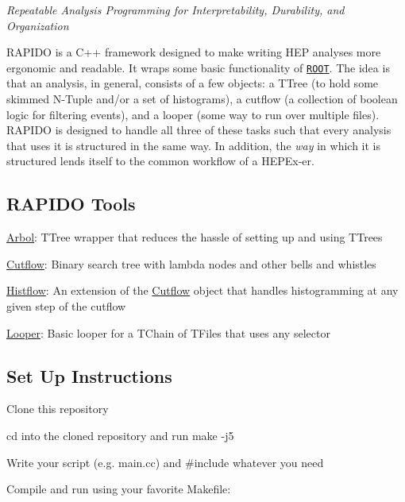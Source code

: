 {\itshape Repeatable Analysis Programming for Interpretability, Durability, and Organization}

\href{https://opensource.org/licenses/MIT}{\tt } \href{https://jkguiang.github.io/rapido/html/index.html}{\tt } \href{https://www.codefactor.io/repository/github/jkguiang/rapido/overview/master}{\tt }

R\+A\+P\+I\+DO is a C++ framework designed to make writing H\+EP analyses more ergonomic and readable. It wraps some basic functionality of \href{https://root.cern/}{\tt R\+O\+OT}. The idea is that an analysis, in general, consists of a few objects\+: a T\+Tree (to hold some skimmed N-\/\+Tuple and/or a set of histograms), a cutflow (a collection of boolean logic for filtering events), and a looper (some way to run over multiple files). R\+A\+P\+I\+DO is designed to handle all three of these tasks such that every analysis that uses it is structured in the same way. In addition, the {\itshape way} in which it is structured lends itself to the common workflow of a H\+E\+P\+Ex-\/er.

\subsection*{R\+A\+P\+I\+DO Tools}


\begin{DoxyEnumerate}
\item \hyperlink{classArbol}{Arbol}\+: T\+Tree wrapper that reduces the hassle of setting up and using T\+Trees
\item \hyperlink{classCutflow}{Cutflow}\+: Binary search tree with lambda nodes and other bells and whistles
\begin{DoxyItemize}
\item \hyperlink{classHistflow}{Histflow}\+: An extension of the \hyperlink{classCutflow}{Cutflow} object that handles histogramming at any given step of the cutflow
\end{DoxyItemize}
\item \hyperlink{classLooper}{Looper}\+: Basic looper for a T\+Chain of T\+Files that uses any selector
\end{DoxyEnumerate}

\subsection*{Set Up Instructions}


\begin{DoxyEnumerate}
\item Clone this repository
\item {\ttfamily cd} into the cloned repository and run {\ttfamily make -\/j5}
\item Write your script (e.\+g. {\ttfamily main.\+cc}) and {\ttfamily \#include} whatever you need
\item Compile and run using your favorite {\ttfamily Makefile}\+: 

\end{DoxyEnumerate}

